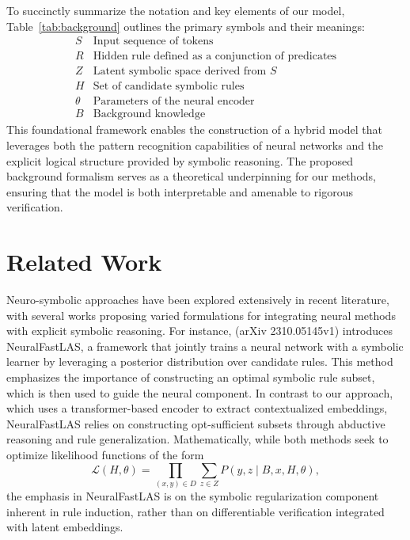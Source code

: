 \documentclass{article}
\begin{document}
To succinctly summarize the notation and key elements of our model, Table~\ref{tab:background} outlines the primary symbols and their meanings:
\[
\begin{array}{ll}
S        & \text{Input sequence of tokens} \\
R        & \text{Hidden rule defined as a conjunction of predicates} \\
Z        & \text{Latent symbolic space derived from } S \\
H        & \text{Set of candidate symbolic rules} \\
\theta   & \text{Parameters of the neural encoder} \\
B        & \text{Background knowledge}
\end{array}
\]
This foundational framework enables the construction of a hybrid model that leverages both the pattern recognition capabilities of neural networks and the explicit logical structure provided by symbolic reasoning. The proposed background formalism serves as a theoretical underpinning for our methods, ensuring that the model is both interpretable and amenable to rigorous verification.

\section{Related Work}
Neuro-symbolic approaches have been explored extensively in recent literature, with several works proposing varied formulations for integrating neural methods with explicit symbolic reasoning. For instance, (arXiv 2310.05145v1) introduces NeuralFastLAS, a framework that jointly trains a neural network with a symbolic learner by leveraging a posterior distribution over candidate rules. This method emphasizes the importance of constructing an optimal symbolic rule subset, which is then used to guide the neural component. In contrast to our approach, which uses a transformer-based encoder to extract contextualized embeddings, NeuralFastLAS relies on constructing opt-sufficient subsets through abductive reasoning and rule generalization. Mathematically, while both methods seek to optimize likelihood functions of the form 
\[
\mathcal{L}(H,\theta)=\prod_{(x,y) \in D}\sum_{z \in Z} P(y,z \mid B,x,H,\theta),
\]
the emphasis in NeuralFastLAS is on the symbolic regularization component inherent in rule induction, rather than on differentiable verification integrated with latent embeddings.
\end{document}
